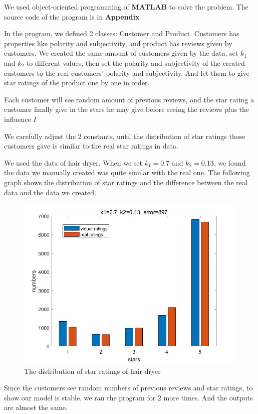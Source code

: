 \documentclass[12pt]{article}  %
\begin{document}
We used object-oriented programming of \textbf{MATLAB} to solve the problem. The source code of the program is in \textbf{Appendix}

In the program, we defined 2 classes: Customer and Product. Customers has properties like polarity and subjectivity, and product has reviews given by customers. We created the same amount of customers given by the data, set $k_1$ and $k_2$ to different values, then set the polarity and subjectivity of the created customers to the real customers' polarity and subjectivity. And let them to give star ratings of the product one by one in order.

Each customer will see random amount of previous reviews, and the star rating a customer finally give in the stars he may give before seeing the reviews plus the influence $I$

We carefully adjust the 2 constants, until the distribution of star ratings those customers gave is similar to the real star ratings in data.

We used the data of hair dryer. When we set $k_1=0.7$ and $k_2=0.13$, we found the data we manually created was quite similar with the real one. The following graph shows the distribution of star ratings and the difference between the real data and the data we created.

\begin{figure}[H]
  \centering
  \includegraphics[width=0.7\linewidth]{Q4picture/0.jpg}
  \caption{The distribution of star ratings of hair dryer}
  \label{fig:}
\end{figure}

Since the customers see random numbers of previous reviews and star ratings, to show our model is stable, we ran the program for 2 more times. And the outputs are almost the same.
\end{document}

